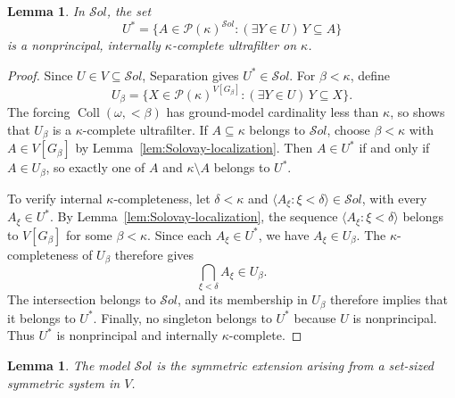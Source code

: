 \documentclass[11pt,a4paper]{amsart}
\newcommand{\Coll}{\operatorname{Coll}}
\theoremstyle{plain}
\newtheorem{lemma}[theorem]{Lemma}
\theoremstyle{definition}
\theoremstyle{remark}
\begin{document}
\begin{lemma}\label{lem:Solovay-measure}
In $\mathcal S\!ol$, the set
\[
U^*=\{A\in\mathcal P(\kappa)^{\mathcal S\!ol}:
(\exists Y\in U)\,Y\subseteq A\}
\]
is a nonprincipal, internally $\kappa$-complete ultrafilter on $\kappa$.
\end{lemma}

\begin{proof}
Since $U\in V\subseteq\mathcal S\!ol$, Separation gives $U^*\in\mathcal S\!ol$.  For $\beta<\kappa$, define
\[
U_\beta=\{X\in\mathcal P(\kappa)^{V[G_\beta]}:
(\exists Y\in U)\,Y\subseteq X\}.
\]
The forcing ${\Coll}(\omega,{<}\beta)$ has ground-model cardinality less than $\kappa$, so \cite[Theorem~2.5(2)]{Banerjee} shows that $U_\beta$ is a $\kappa$-complete ultrafilter.  If $A\subseteq\kappa$ belongs to $\mathcal S\!ol$, choose $\beta<\kappa$ with $A\in V[G_\beta]$ by Lemma~\ref{lem:Solovay-localization}.  Then $A\in U^*$ if and only if $A\in U_\beta$, so exactly one of $A$ and $\kappa\setminus A$ belongs to $U^*$.

To verify internal $\kappa$-completeness, let $\delta<\kappa$ and
$\langle A_\xi:\xi<\delta\rangle\in\mathcal S\!ol$, with every
$A_\xi\in U^*$.  By Lemma~\ref{lem:Solovay-localization}, the sequence
$\langle A_\xi:\xi<\delta\rangle$ belongs to $V[G_\beta]$ for some
$\beta<\kappa$.  Since each $A_\xi\in U^*$, we have $A_\xi\in U_\beta$.  The $\kappa$-completeness of $U_\beta$ therefore gives
\[
\bigcap_{\xi<\delta}A_\xi\in U_\beta.
\]
The intersection belongs to $\mathcal S\!ol$, and its membership in $U_\beta$ therefore implies that it belongs to $U^*$.  Finally, no singleton belongs to $U^*$ because $U$ is nonprincipal.  Thus $U^*$ is nonprincipal and internally $\kappa$-complete.
\end{proof}

\begin{lemma}\label{lem:Solovay-symmetric}
The model $\mathcal S\!ol$ is the symmetric extension arising from a set-sized symmetric system in $V$.
\end{lemma}
\end{document}
